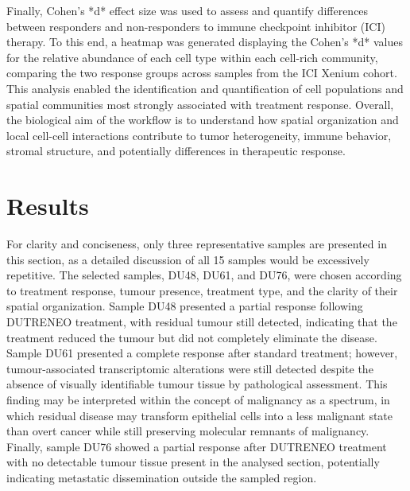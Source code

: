 Finally, Cohen's *d* effect size was used to assess and quantify differences between responders and non-responders to immune checkpoint inhibitor (ICI) therapy. To this end, a heatmap was generated displaying the Cohen's *d* values for the relative abundance of each cell type within each cell-rich community, comparing the two response groups across samples from the ICI Xenium cohort. This analysis enabled the identification and quantification of cell populations and spatial communities most strongly associated with treatment response. Overall, the biological aim of the workflow is to understand how spatial organization and local cell-cell interactions contribute to tumor heterogeneity, immune behavior, stromal structure, and potentially differences in therapeutic response.

\section{Results}

For clarity and conciseness, only three representative samples are presented in this section, as a detailed discussion of all 15 samples would be excessively repetitive. The selected samples, DU48, DU61, and DU76, were chosen according to treatment response, tumour presence, treatment type, and the clarity of their spatial organization. Sample DU48 presented a partial response following DUTRENEO treatment, with residual tumour still detected, indicating that the treatment reduced the tumour but did not completely eliminate the disease. Sample DU61 presented a complete response after standard treatment; however, tumour-associated transcriptomic alterations were still detected despite the absence of visually identifiable tumour tissue by pathological assessment. This finding may be interpreted within the concept of malignancy as a spectrum, in which residual disease may transform epithelial cells into a less malignant state than overt cancer while still preserving molecular remnants of malignancy. Finally, sample DU76 showed a partial response after DUTRENEO treatment with no detectable tumour tissue present in the analysed section, potentially indicating metastatic dissemination outside the sampled region.



